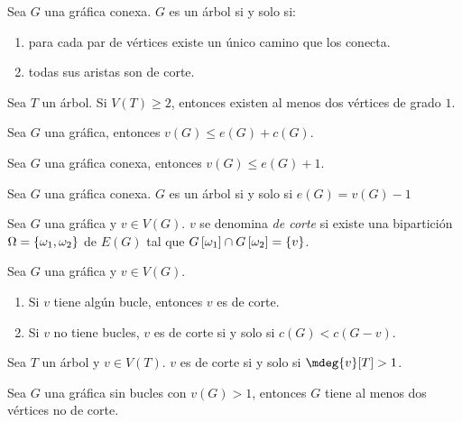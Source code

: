 \begin{theorem}
	Sea $G$ una gráfica conexa. $G$ es un árbol si y solo si:
	\begin{enumerate}
		\item para cada par de vértices existe un único camino que los conecta.
		\item todas sus aristas son de corte.
	\end{enumerate}
\end{theorem}
\begin{theorem}
	Sea $T$ un árbol. Si $V(T)\geq 2$, entonces existen al menos dos vértices de grado $1$.
\end{theorem}
\begin{theorem}
	Sea $G$ una gráfica, entonces $v(G)\leq e(G) + c(G)$.
\end{theorem}
\begin{coll}
	Sea $G$ una gráfica conexa, entonces $v(G)\leq e(G) + 1$.
\end{coll}
\begin{coll}
	Sea $G$ una gráfica conexa. $G$ es un árbol si y solo si $e(G) = v(G) - 1$
\end{coll}
\begin{definition}
	Sea $G$ una gráfica y $v\in V(G)$. $v$ se denomina \emph{de corte} si existe una bipartición $\Omega =\left\{ \omega_{1},\omega_{2} \right\}$ de $E(G)$ tal que $G\left[ \omega_{1} \right]\cap G\left[ \omega_{2} \right] =\left\{ v \right\}$.
\end{definition}
\begin{theorem}
	Sea $G$ una gráfica y $v\in V(G)$.
	\begin{enumerate}
		\item Si $v$ tiene algún bucle, entonces $v$ es de corte.
		\item Si $v$ no tiene bucles, $v$ es de corte si y solo si $c(G) < c(G - v)$.
	\end{enumerate}
\end{theorem}
\begin{theorem}
	Sea $T$ un árbol y $v\in V(T)$. $v$ es de corte si y solo si $\mdeg{v}[T] > 1$.
\end{theorem}
\begin{coll}
	Sea $G$ una gráfica sin bucles con $v(G) > 1$, entonces $G$ tiene al menos dos vértices no de corte.
\end{coll}
